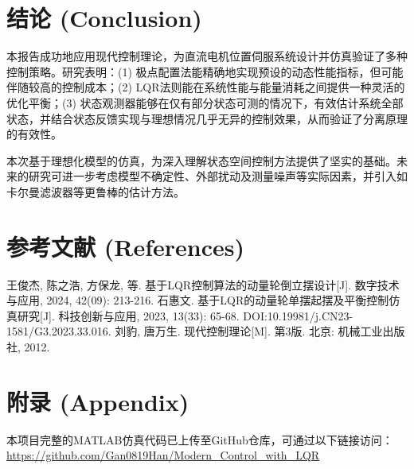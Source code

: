 \documentclass[12pt, a4paper]{article}
\begin{document}
\section{结论 (Conclusion)}
本报告成功地应用现代控制理论，为直流电机位置伺服系统设计并仿真验证了多种控制策略。研究表明：(1) 极点配置法能精确地实现预设的动态性能指标，但可能伴随较高的控制成本；(2) LQR法则能在系统性能与能量消耗之间提供一种灵活的优化平衡；(3) 状态观测器能够在仅有部分状态可测的情况下，有效估计系统全部状态，并结合状态反馈实现与理想情况几乎无异的控制效果，从而验证了分离原理的有效性。

本次基于理想化模型的仿真，为深入理解状态空间控制方法提供了坚实的基础。未来的研究可进一步考虑模型不确定性、外部扰动及测量噪声等实际因素，并引入如卡尔曼滤波器等更鲁棒的估计方法。

\section{参考文献 (References)}
\begin{thebibliography}{9}
     王俊杰, 陈之浩, 方保龙, 等. 基于LQR控制算法的动量轮倒立摆设计[J]. 数字技术与应用, 2024, 42(09): 213-216.
     石惠文. 基于LQR的动量轮单摆起摆及平衡控制仿真研究[J]. 科技创新与应用, 2023, 13(33): 65-68. DOI:10.19981/j.CN23-1581/G3.2023.33.016.
     刘豹, 唐万生. 现代控制理论[M]. 第3版. 北京: 机械工业出版社, 2012.
\end{thebibliography}

\appendix
\section{附录 (Appendix)}
\noindent
本项目完整的MATLAB仿真代码已上传至GitHub仓库，可通过以下链接访问：
\url{https://github.com/Gan0819Han/Modern_Control_with_LQR}
\end{document}
